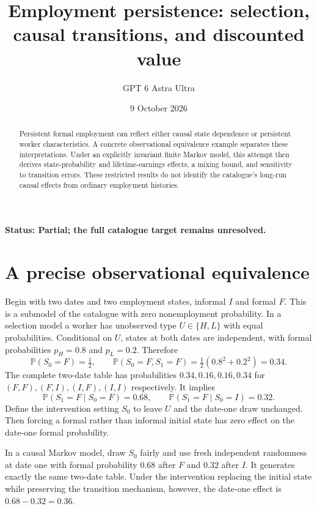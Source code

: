 \documentclass[11pt,a4paper]{article}
\title{Employment persistence: selection, causal transitions, and discounted value}
\author{GPT 6 Astra Ultra}
\date{9 October 2026}
\newcommand{\Prob}{\mathbb P}
\begin{document}
\maketitle
\textbf{Status: Partial; the full catalogue target remains unresolved.}
\begin{abstract}
Persistent formal employment can reflect either causal state dependence or
persistent worker characteristics. A concrete observational equivalence
example separates these interpretations. Under an explicitly invariant finite
Markov model, this attempt then derives state-probability and lifetime-earnings
effects, a mixing bound, and sensitivity to transition errors. These restricted
results do not identify the catalogue's long-run causal effects from ordinary
employment histories.
\end{abstract}

\section{A precise observational equivalence}
Begin with two dates and two employment states, informal $I$ and formal $F$.
This is a submodel of the catalogue with zero nonemployment probability.
In a selection model a worker has unobserved type $U\in\{H,L\}$ with equal
probabilities. Conditional on $U$, states at both dates are independent,
with formal probabilities $p_H=0.8$ and $p_L=0.2$. Therefore
\[
 \Prob(S_0=F)=\tfrac12,\qquad
 \Prob(S_0=F,S_1=F)=\tfrac12(0.8^2+0.2^2)=0.34.
\]
The complete two-date table has probabilities $0.34,0.16,0.16,0.34$
for $(F,F),(F,I),(I,F),(I,I)$ respectively. It implies
\[
 \Prob(S_1=F\mid S_0=F)=0.68,\qquad
 \Prob(S_1=F\mid S_0=I)=0.32.                              \tag{1}
\]
Define the intervention setting $S_0$ to leave $U$ and the date-one draw
unchanged. Then forcing a formal rather than informal initial state has
zero effect on the date-one formal probability.

In a causal Markov model, draw $S_0$ fairly and use fresh independent randomness
at date one with formal probability $0.68$ after $F$ and $0.32$ after $I$.
It generates exactly the same two-date table. Under the intervention replacing
the initial state while preserving the transition mechanism, however, the
date-one effect is $0.68-0.32=0.36$.
\end{document}
